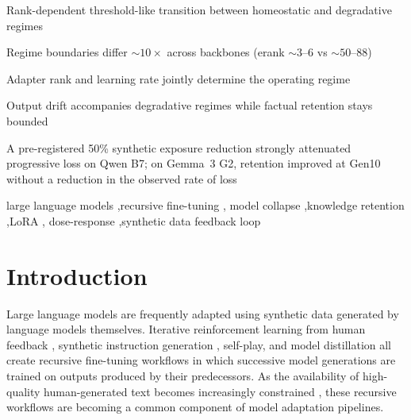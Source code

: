 \documentclass[a4paper,fleqn]{cas-dc}
\newif\ifshowchanges
\newcommand{\rev}[1]{\ifshowchanges{\color{blue}#1}\else{#1}\fi}
\begin{document}
\begin{highlights}
\item \rev{Rank-dependent threshold-like transition between homeostatic and degradative regimes}
\item \rev{Regime boundaries differ ${\sim}10{\times}$ across backbones (erank ${\sim}3$--$6$ vs ${\sim}50$--$88$)}
\item \rev{Adapter rank and learning rate jointly determine the operating regime}
\item Output drift accompanies degradative regimes while factual retention stays bounded
\item \rev{A pre-registered 50\% synthetic exposure reduction strongly attenuated progressive loss on Qwen B7; on Gemma~3 G2, retention improved at Gen10 without a reduction in the observed rate of loss}
\end{highlights}

\begin{keywords}
large language models \sep recursive fine-tuning \sep
model collapse \sep knowledge retention \sep LoRA \sep
dose-response \sep synthetic data feedback loop
\end{keywords}

\maketitle

\section{Introduction}\label{sec:introduction}

Large language models are frequently adapted using synthetic data generated by
language models themselves. Iterative reinforcement learning from human feedback
\citep{ouyang2022training}, synthetic instruction generation
\citep{wang2023selfinstruct,taori2023alpaca}, self-play, and model distillation
all create recursive fine-tuning workflows in which successive model generations
are trained on outputs produced by their predecessors. As the availability of high-quality
human-generated text becomes increasingly constrained \citep{villalobos2024},
these recursive workflows are becoming a common component of model adaptation
pipelines.
\end{document}
